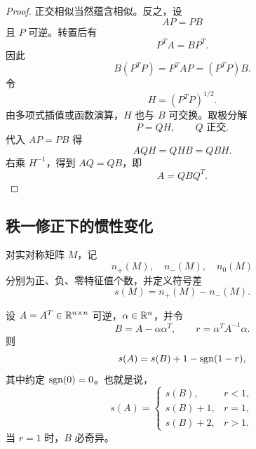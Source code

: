\begin{proof}
正交相似当然蕴含相似。反之，设
\begin{equation}
 AP=PB
\end{equation}
且 $P$ 可逆。转置后有
\begin{equation}
 P^TA=BP^T.
\end{equation}
因此
\begin{equation}
 B(P^TP)=P^TAP=(P^TP)B.
\end{equation}
令
\begin{equation}
 H=(P^TP)^{1/2}.
\end{equation}
由多项式插值或函数演算，$H$ 也与 $B$ 可交换。取极分解
\begin{equation}
 P=QH,
 \qquad Q\text{ 正交}.
\end{equation}
代入 $AP=PB$ 得
\begin{equation}
 AQH=QHB=QBH.
\end{equation}
右乘 $H^{-1}$，得到 $AQ=QB$，即
\begin{equation}
 A=QBQ^T.
\end{equation}
\end{proof}

\subsection{秩一修正下的惯性变化}

对实对称矩阵 $M$，记
\begin{equation}
 n_+(M),\quad n_-(M),\quad n_0(M)
\end{equation}
分别为正、负、零特征值个数，并定义符号差
\begin{equation}
 s(M)=n_+(M)-n_-(M).
\end{equation}

\begin{theorem}
设 $A=A^T\in\mathbb R^{n\times n}$ 可逆，$\alpha\in\mathbb R^n$，并令
\begin{equation}
 B=A-\alpha\alpha^T,
 \qquad
 r=\alpha^TA^{-1}\alpha.
\end{equation}
则
\begin{equation}
 s(A)=s(B)+1-\operatorname{sgn}(1-r),
\end{equation}
其中约定 $\operatorname{sgn}(0)=0$。也就是说，
\begin{equation}
 s(A)=
 \begin{cases}
 s(B),&r<1,\\
 s(B)+1,&r=1,\\
 s(B)+2,&r>1.
 \end{cases}
\end{equation}
当 $r=1$ 时，$B$ 必奇异。
\end{theorem}


